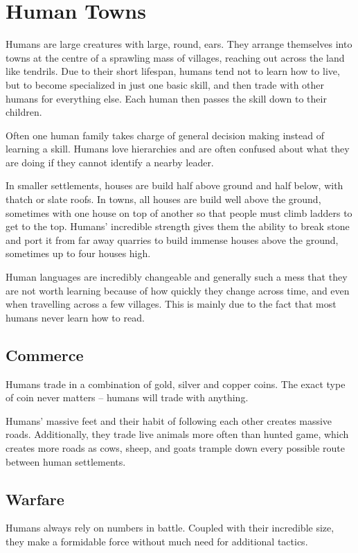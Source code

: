 \section[Humans]{Human Towns \Hu}

\begin{multicols}{2}

\noindent
Humans are large creatures with large, round, ears.
They arrange themselves into towns at the centre of a sprawling mass of villages, reaching out across the land like tendrils.
Due to their short lifespan, humans tend not to learn how to live, but to become specialized in just one basic skill, and then trade with other humans for everything else.
Each human then passes the skill down to their children.

Often one human family takes charge of general decision making instead of learning a skill.
Humans love hierarchies and are often confused about what they are doing if they cannot identify a nearby leader.

In smaller settlements, houses are build half above ground and half below, with thatch or slate roofs.
In towns, all houses are build well above the ground, sometimes with one house on top of another so that people must climb ladders to get to the top.
Humans' incredible strength gives them the ability to break stone and port it from far away quarries to build immense houses above the ground, sometimes up to four houses high.

Human languages are incredibly changeable and generally such a mess that they are not worth learning because of how quickly they change across time, and even when travelling across a few villages.
This is mainly due to the fact that most humans never learn how to read.

\subsection{Commerce}

Humans trade in a combination of gold, silver and copper coins.
The exact type of coin never matters -- humans will trade with anything.

Humans' massive feet and their habit of following each other creates massive roads.
Additionally, they trade live animals more often than hunted game, which creates more roads as cows, sheep, and goats trample down every possible route between human settlements.

\subsection{Warfare}
Humans always rely on numbers in battle.
Coupled with their incredible size, they make a formidable force without much need for additional tactics.


\end{multicols}

